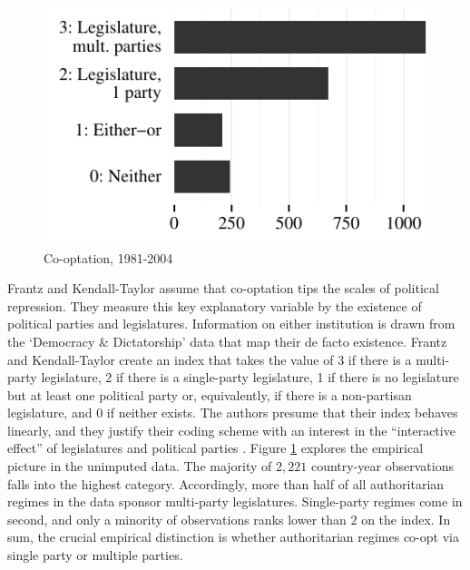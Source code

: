 \begin{figure}
\centering
\includegraphics[width=\linewidth]{./sections/02data/barCooptation.pdf}
\caption{Co-optation, 1981-2004}
\label{fig:barCooptation}
\end{figure}
Frantz and Kendall-Taylor assume that co-optation tips the 
scales of political repression. They measure this key 
explanatory variable by the existence of political parties 
and legislatures. Information on either institution is drawn 
from the `Democracy \& Dictatorship' data 
\citep{Cheibub.2010} that map their de facto existence. 
Frantz and Kendall-Taylor create an index that takes the 
value of 3 if there is a multi-party legislature, 
2 if there is a single-party legislature, 1 if there is no 
legislature but at least one political party or, 
equivalently, if there is a non-partisan legislature, and 0 
if neither exists. The authors presume that their index 
behaves linearly, and they justify their coding scheme with 
an interest in the ``interactive effect'' of legislatures 
and political parties \citep[338]{Frantz.2014}. Figure 
\ref{fig:barCooptation} explores the empirical picture in 
the unimputed data. The majority of $2,221$ country-year 
observations falls into the highest category. Accordingly, 
more than half of all authoritarian regimes in the data 
sponsor multi-party legislatures. Single-party regimes come 
in second, and only a minority of observations ranks lower 
than $2$ on the index. In sum, the crucial empirical 
distinction is whether authoritarian regimes co-opt via 
single party or multiple parties.